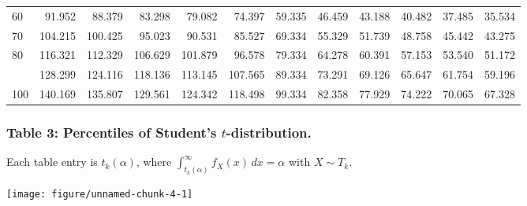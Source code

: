 \documentclass[
]{article}
\begin{document}
\begin{longtable}[t]{lrrrrrrrrrrr}
60 & 91.952 & 88.379 & 83.298 & 79.082 & 74.397 & 59.335 & 46.459 & 43.188 & 40.482 & 37.485 & 35.534\\
70 & 104.215 & 100.425 & 95.023 & 90.531 & 85.527 & 69.334 & 55.329 & 51.739 & 48.758 & 45.442 & 43.275\\
80 & 116.321 & 112.329 & 106.629 & 101.879 & 96.578 & 79.334 & 64.278 & 60.391 & 57.153 & 53.540 & 51.172\\
\addlinespace
90 & 128.299 & 124.116 & 118.136 & 113.145 & 107.565 & 89.334 & 73.291 & 69.126 & 65.647 & 61.754 & 59.196\\
100 & 140.169 & 135.807 & 129.561 & 124.342 & 118.498 & 99.334 & 82.358 & 77.929 & 74.222 & 70.065 & 67.328\\
\bottomrule
\end{longtable}

\newpage

\subsubsection{\texorpdfstring{Table 3: Percentiles of Student's
\(t\)-distribution.}{Table 3: Percentiles of Student's t-distribution.}}\label{table-3-percentiles-of-students-t-distribution.}

Each table entry is \(t_k(\alpha)\), where
\(\int_{t_k(\alpha)}^{\infty}f_X(x) \, dx = \alpha\) with \(X\sim T_k\).

\begin{center}\texttt{[image: figure/unnamed-chunk-4-1]} \end{center}
\end{document}
